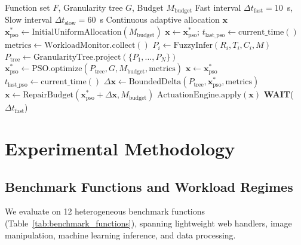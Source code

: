 \documentclass[final,5p,times,twocolumn]{elsarticle}
\begin{document}
\begin{algorithm}[H]
\caption{GranuWarm Dual-Timescale Control Loop}
\label{alg:control_loop}
\begin{algorithmic}[1]
\Require Function set $F$, Granularity tree $G$, Budget $M_{\text{budget}}$
\Require Fast interval $\Delta t_{\text{fast}} = 10$~s, Slow interval $\Delta t_{\text{slow}} = 60$~s
\Ensure Continuous adaptive allocation $\mathbf{x}$
\State $\mathbf{x}_{\text{pso}}^* \leftarrow \text{InitialUniformAllocation}(M_{\text{budget}})$
\State $\mathbf{x} \leftarrow \mathbf{x}_{\text{pso}}^*$; $t_{\text{last\_pso}} \leftarrow \text{current\_time}()$
\Loop
    \State $\text{metrics} \leftarrow \text{WorkloadMonitor.collect}()$
        \State $P_i \leftarrow \text{FuzzyInfer}(R_i, T_i, C_i, M)$
    \EndFor
    \State $P_{\text{tree}} \leftarrow \text{GranularityTree.project}(\{P_1, \ldots, P_N\})$
        \State $\mathbf{x}_{\text{pso}}^* \leftarrow \text{PSO.optimize}(P_{\text{tree}}, G, M_{\text{budget}}, \text{metrics})$
        \State $\mathbf{x} \leftarrow \mathbf{x}_{\text{pso}}^*$
        \State $t_{\text{last\_pso}} \leftarrow \text{current\_time}()$
    \Else
        \State $\Delta \mathbf{x} \leftarrow \text{BoundedDelta}(P_{\text{tree}}, \mathbf{x}_{\text{pso}}^*, \text{metrics})$
        \State $\mathbf{x} \leftarrow \text{RepairBudget}(\mathbf{x}_{\text{pso}}^* + \Delta \mathbf{x}, M_{\text{budget}})$
    \EndIf
    \State $\text{ActuationEngine.apply}(\mathbf{x})$
    \State \textbf{WAIT}($\Delta t_{\text{fast}}$)
\EndLoop
\end{algorithmic}
\end{algorithm}

\Needspace{0.22\textheight}
\section{Experimental Methodology}

\subsection{Benchmark Functions and Workload Regimes}

We evaluate on 12 heterogeneous benchmark functions (Table~\ref{tab:benchmark_functions}), spanning lightweight web handlers, image manipulation, machine learning inference, and data processing.
\end{document}
